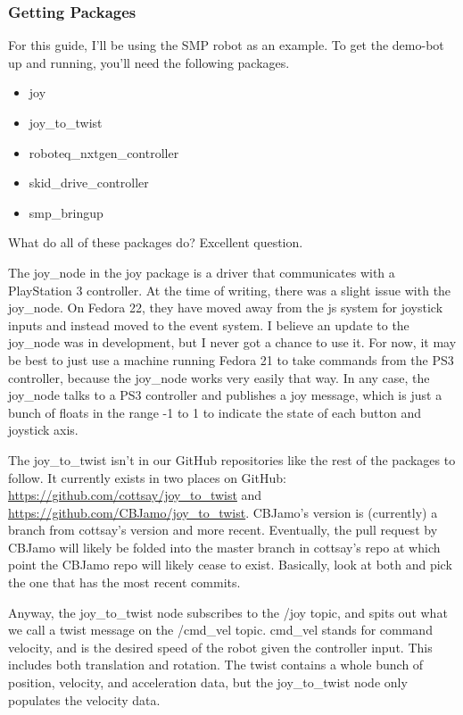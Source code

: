 \subsubsection{Getting Packages}

 For this guide, I'll be using the SMP robot as an example. To get the demo-bot up and running, you'll need the following packages.

\begin{itemize}
\item{joy}
\item{joy\_to\_twist}
\item{roboteq\_nxtgen\_controller}
\item{skid\_drive\_controller}
\item{smp\_bringup}
\end{itemize}

What do all of these packages do? Excellent question.

The joy\_node in the joy package is a driver that communicates with a PlayStation 3 controller. At the time of writing, there was a slight issue with the joy\_node. On Fedora 22, they have moved away from the js system for joystick inputs and instead moved to the event system. I believe an update to the joy\_node was in development, but I never got a chance to use it. For now, it may be best to just use a machine running Fedora 21 to take commands from the PS3 controller, because the joy\_node works very easily that way. In any case, the joy\_node talks to a PS3 controller and publishes a joy message, which is just a bunch of floats in the range -1 to 1 to indicate the state of each button and joystick axis.

The joy\_to\_twist isn't in our GitHub repositories like the rest of the packages to follow. It currently exists in two places on GitHub: \url{https://github.com/cottsay/joy_to_twist} and \url{https://github.com/CBJamo/joy_to_twist}. CBJamo's version is (currently) a branch from cottsay's version and more recent. Eventually, the pull request by CBJamo will likely be folded into the master branch in cottsay's repo at which point the CBJamo repo will likely cease to exist. Basically, look at both and pick the one that has the most recent commits.

Anyway, the joy\_to\_twist node subscribes to the /joy topic, and spits out what we call a twist message on the /cmd\_vel topic. cmd\_vel stands for command velocity, and is the desired speed of the robot given the controller input. This includes both translation and rotation. The twist contains a whole bunch of position, velocity, and acceleration data, but the joy\_to\_twist node only populates the velocity data.

